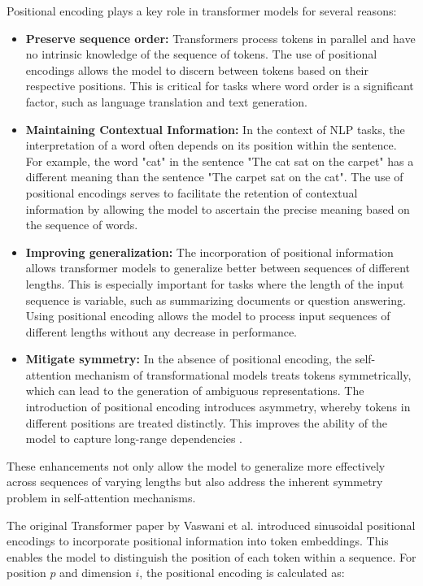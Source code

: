 Positional encoding plays a key role in transformer models for several reasons:

\begin{itemize}
    \item \textbf{Preserve sequence order:} Transformers process tokens in parallel and have no intrinsic knowledge of the sequence of tokens. The use of positional encodings allows the model to discern between tokens based on their respective positions. This is critical for tasks where word order is a significant factor, such as language translation and text generation.
    
    \item \textbf{Maintaining Contextual Information:} In the context of NLP tasks, the interpretation of a word often depends on its position within the sentence. For example, the word "cat" in the sentence "The cat sat on the carpet" has a different meaning than the sentence "The carpet sat on the cat". The use of positional encodings serves to facilitate the retention of contextual information by allowing the model to ascertain the precise meaning based on the sequence of words.
    
    \item \textbf{Improving generalization:} The incorporation of positional information allows transformer models to generalize better between sequences of different lengths. This is especially important for tasks where the length of the input sequence is variable, such as summarizing documents or question answering. Using positional encoding allows the model to process input sequences of different lengths without any decrease in performance.
    
    \item \textbf{Mitigate symmetry:} In the absence of positional encoding, the self-attention mechanism of transformational models treats tokens symmetrically, which can lead to the generation of ambiguous representations. The introduction of positional encoding introduces asymmetry, whereby tokens in different positions are treated distinctly. This improves the ability of the model to capture long-range dependencies \cite{geeksforgeeks2024-pe}.
\end{itemize}

These enhancements not only allow the model to generalize more effectively across sequences of varying lengths but also address the inherent symmetry problem in self-attention mechanisms.

The original Transformer paper by Vaswani et al. \cite{vaswani2017attention} introduced sinusoidal positional encodings to incorporate positional information into token embeddings. This enables the model to distinguish the position of each token within a sequence. For position \( p \) and dimension \( i \), the positional encoding is calculated as:

